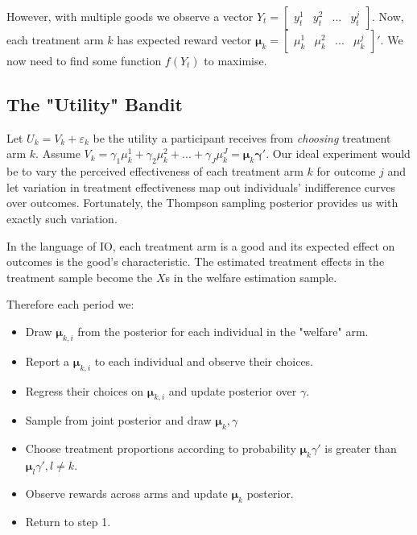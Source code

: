 \documentclass{article}
\begin{document}
However, with multiple goods we observe a  vector  $Y_t = \begin{bmatrix} y^1_t & y^2_t & ... & y^j_t\end{bmatrix}$.
Now, each treatment arm $k$ has expected reward vector $\bm{\mu}_k = \begin{bmatrix}
    \mu^1_k & \mu^2_k & ... & \mu^j_k
\end{bmatrix}'$. We now need to find some function $f(Y_t)$ to maximise. 

\subsection*{The "Utility" Bandit}

Let $U_k = V_k + \varepsilon_k$ be the utility a 
participant receives from \textit{choosing} treatment arm $k$. Assume $V_k = 
\gamma_1 \mu^1_k + \gamma_2 \mu^2_k + ... + \gamma_J \mu^J_k = \bm{\mu}_k\bm{\gamma}'$. Our ideal experiment would be to vary the perceived effectiveness of each treatment arm $k$ for 
outcome $j$ and let variation in treatment effectiveness map out individuals' 
indifference curves over outcomes. Fortunately, the Thompson sampling posterior 
provides us with exactly such variation.


In the language of IO, each treatment arm is a good and its expected effect on outcomes 
is the good's characteristic. The estimated treatment effects in the treatment sample 
become the $X$s in the welfare estimation sample.

Therefore each period we:

    \begin{itemize}
        \item Draw $\bm{\mu}_{k, i}$ from the posterior for each individual in the "welfare" arm. 
        \item Report a $\bm{\mu}_{k, i}$ to each individual and observe their choices.
        \item Regress their choices on $\bm{\mu}_{k,i}$ and update posterior over $\gamma$.
        \item Sample from joint posterior and draw $\bm{\mu}_{k}, \gamma$
        \item Choose treatment proportions according to probability  $\bm{\mu}_k \gamma'$ is 
        greater than $\bm{\mu}_l \gamma', l \neq k$.
        \item Observe rewards across arms and update $\bm{\mu}_k$ posterior.
        \item Return to step 1.
         \end{itemize}

\end{document}
